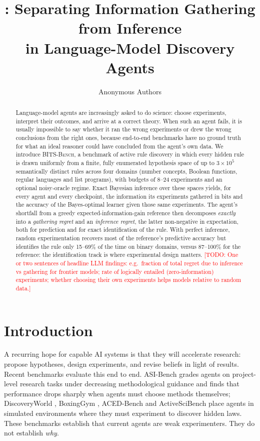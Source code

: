 \documentclass[11pt]{article}
\title{\bench: Separating Information Gathering from Inference\\in Language-Model Discovery Agents}
\author{Anonymous Authors}
\date{}
\newcommand{\todo}[1]{\textcolor{red}{[TODO: #1]}}
\newcommand{\bench}{\textsc{BITS-Bench}}
\begin{document}
\maketitle

\begin{abstract}
Language-model agents are increasingly asked to do science: choose experiments, interpret their
outcomes, and arrive at a correct theory. When such an agent fails, it is usually impossible to say
whether it ran the wrong experiments or drew the wrong conclusions from the right ones, because
end-to-end benchmarks have no ground truth for what an ideal reasoner could have concluded from the
agent's own data. We introduce \bench{}, a benchmark of active rule discovery in which every hidden
rule is drawn uniformly from a finite, fully enumerated hypothesis space of up to $3\times10^5$
semantically distinct rules across four domains (number concepts, Boolean functions, regular
languages and list programs), with budgets of 8--24 experiments and an optional noisy-oracle regime.
Exact Bayesian inference over these spaces yields, for every agent and every checkpoint, the
information its experiments gathered in bits and the accuracy of the Bayes-optimal learner given
those same experiments. The agent's shortfall from a greedy expected-information-gain reference then
decomposes \emph{exactly} into a \emph{gathering regret} and an \emph{inference regret}, the latter
non-negative in expectation, both for prediction and for exact identification of the rule. With
perfect inference, random experimentation recovers most of the reference's predictive accuracy but
identifies the rule only 15--69\% of the time on binary domains, versus 87--100\% for the reference:
the identification track is where experimental design matters. \todo{One or two sentences of headline
LLM findings: e.g.\ fraction of total regret due to inference vs gathering for frontier models; rate of
logically entailed (zero-information) experiments; whether choosing their own experiments helps
models relative to random data.}
\end{abstract}

\section{Introduction}

A recurring hope for capable AI systems is that they will accelerate research: propose hypotheses,
design experiments, and revise beliefs in light of results. Recent benchmarks evaluate this end to
end. ASI-Bench \citep{asibench2026} grades agents on project-level research tasks under decreasing
methodological guidance and finds that performance drops sharply when agents must choose methods
themselves; DiscoveryWorld \citep{jansen2024discoveryworld}, BoxingGym \citep{gandhi2025boxinggym},
ACED-Bench \citep{acedbench2026} and ActiveSciBench \citep{autoscilab2026} place agents in simulated
environments where they must experiment to discover hidden laws. These benchmarks establish that
current agents are weak experimenters. They do not establish \emph{why}.
\end{document}
